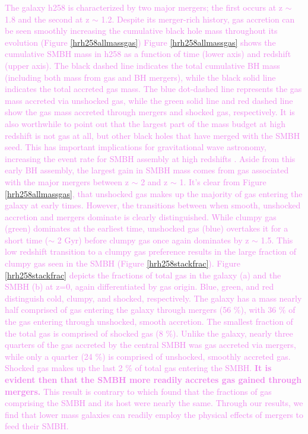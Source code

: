 \documentclass[manuscript]{aastex}
\begin{document}
\textcolor{violet}{
The galaxy h258 is characterized by two major mergers; the first occurs at z $\sim$ 1.8 and the second at z $\sim$ 1.2. Despite its merger-rich history, gas accretion can be seen smoothly increasing the cumulative black hole mass throughout its evolution (Figure \ref{hrh258allmassgas}) Figure \ref{hrh258allmassgas} shows the cumulative SMBH mass in h258 as a function of time (lower axis) and redshift (upper axis). The black dashed line indicates the total cumulative BH mass (including both mass from gas and BH mergers), while the black solid line indicates the total accreted gas mass. The blue dot-dashed line represents the gas mass accreted via unshocked gas, while the green solid line and red dashed line show the gas mass accreted through mergers and shocked gas, respectively. It is also worthwhile to point out that the largest part of the mass budget at high redshift is not gas at all, but other black holes that have merged with the SMBH seed. This has important implications for gravitational wave astronomy, increasing the event rate for SMBH assembly at high redshifts \citep{Holley-Bockelmann2010}. Aside from this early BH assembly, the largest gain in SMBH mass comes from gas associated with the major mergers between z $\sim$ 2 and z $\sim$ 1. It's clear from Figure \ref{hrh258allmassgas}, that unshocked gas makes up the majority of gas entering the galaxy at early times. However, the transitions between when smooth, unshocked accretion and mergers dominate is clearly distinguished. While clumpy gas (green) dominates at the earliest time, unshocked gas (blue) overtakes it for a short time ($\sim$ 2 Gyr) before clumpy gas once again dominates by z $\sim$ 1.5. 
}
\textcolor{violet}{
This low redshift transition to a clumpy gas preference results in the large fraction of clumpy gas seen in the SMBH (Figure \ref{hrh258stackfrac}). Figure \ref{hrh258stackfrac} depicts the fractions of total gas in the galaxy (a) and the SMBH (b) at z=0, again differentiated by gas origin. Blue, green, and red distinguish cold, clumpy, and shocked, respectively. The galaxy has a mass nearly half comprised of gas entering the galaxy through mergers (56 \%), with 36 \% of the gas entering through unshocked, smooth accretion. The smallest fraction of the total gas is comprised of shocked gas (8 \%). Unlike the galaxy, nearly three quarters of the gas accreted by the central SMBH was gas accreted via mergers, while only a quarter (24 \%) is comprised of unshocked, smoothly accreted gas. Shocked gas makes up the last 2 \% of total gas entering the SMBH. \textbf{It is evident then that the SMBH more readily accretes gas gained through mergers.} This result is contrary to \cite{Bellovary2013} which found that the fractions of gas comprising the SMBH and its host were nearly the same. Through our results, we find that lower mass galaxies can readily employ the physical effects of mergers to feed their SMBH.
}
\end{document}
